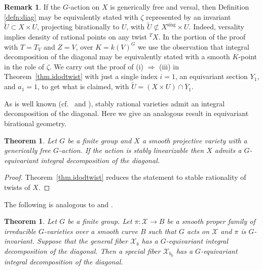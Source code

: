 \documentclass[12pt, reqno]{amsart}
\numberwithin{equation}{section}
\theoremstyle{plain}
\newtheorem{theo}[prop]{Theorem}
\theoremstyle{definition}
\newtheorem{rema}[prop]{Remark}
\begin{document}
\begin{rema}
\label{rem:choicezeta}
If the $G$-action on $X$ is generically free and versal, then Definition \ref{defn:diag} may be equivalently stated with $\zeta$ represented by an invariant $\widetilde{U}\subset X\times U$,
projecting birationally to $U$, with $\widetilde{U}\not\subset X^{\mathrm{sing}}\times U$.
Indeed, versality implies density of rational points on any twist ${}^TX$.
In the portion of the proof with $T=T_V$ and $Z=V$, over $K=k(V)^G$ we use the observation that integral decomposition of the diagonal may be equivalently stated with a smooth $K$-point in the role of $\zeta$.
We carry out the proof of (i) $\Rightarrow$ (iii) in Theorem~\ref{thm.idodtwist} with just a single index $i=1$, an equivariant section $Y_1$, and $a_1=1$, to get what is claimed, with $\widetilde{U}=(X\times U)\cap\overline{Y}_1$.
\end{rema}

As is well known (cf.\ \cite[Sect.\ 3]{saltmanretract} and \cite[Lemma 1.5]{CTP}), stably rational varieties admit an integral decomposition of the diagonal.
Here we give an analogous result in equivariant birational geometry.

\begin{theo}
\label{theo:stablelinearizable}
Let $G$ be a finite group and $X$ a smooth projective variety with a generically free $G$-action. If the action is stably linearizable then $X$ admits a $G$-equivariant integral decomposition of the diagonal.
\end{theo}

\begin{proof}
Theorem~\ref{thm.idodtwist} reduces the statement to stable rationality of twists of $X$.
\end{proof}



The following is analogous to \cite[Thm.\ 2.1]{Voisin15} and \cite[Thm.\ 2.3]{CTP}.

\begin{theo}
\label{theo:specialization}
Let $G$ be a finite group.
Let $\pi : \mathcal X \to B$ be a smooth proper family of irreducible $G$-varieties over a smooth curve $B$ such that $G$ acts on $\mathcal X$ and $\pi$ is $G$-invariant.
Suppose that the general fiber $\mathcal X_b$ has a $G$-equivariant integral decomposition of the diagonal.
Then a special fiber $\mathcal X_{b_0}$ has a  $G$-equivariant integral decomposition of the diagonal.
\end{theo}
\end{document}
